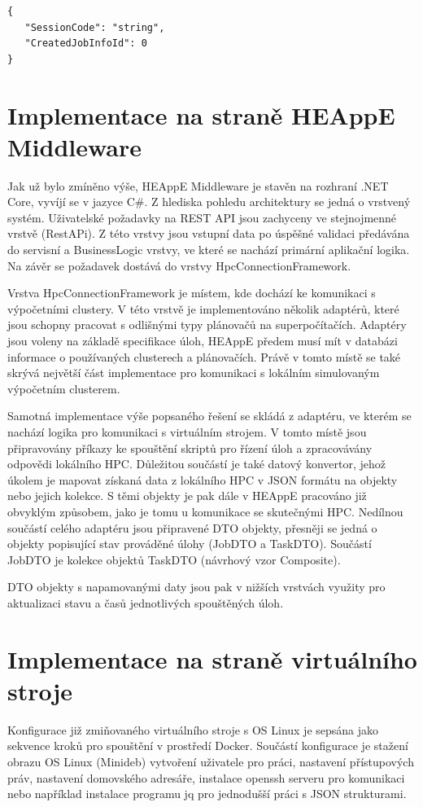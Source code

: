 \hfill \break
\begin{lstlisting}[caption={Příklad json struktury}]
{
   "SessionCode": "string",
   "CreatedJobInfoId": 0
}
\end{lstlisting}

\section{Implementace na straně HEAppE Middleware}
Jak už bylo zmíněno výše, HEAppE Middleware je stavěn na rozhraní .NET Core, vyvíjí se v jazyce C\#. Z hlediska pohledu architektury se jedná o vrstvený systém. Uživatelské požadavky na REST API jsou zachyceny ve stejnojmenné vrstvě (RestAPi). Z této vrstvy jsou vstupní data po úspěšné validaci předávána do servisní a BusinessLogic vrstvy, ve které se nachází primární aplikační logika. Na závěr se požadavek dostává do vrstvy HpcConnectionFramework.

Vrstva HpcConnectionFramework je místem, kde dochází ke komunikaci s výpočetními clustery. V této vrstvě je implementováno několik adaptérů, které jsou schopny pracovat s odlišnými typy plánovačů na superpočítačích. Adaptéry jsou voleny na základě specifikace úloh, HEAppE předem musí mít v databázi informace o používaných clusterech a plánovačích. Právě v tomto místě se také skrývá největší část implementace pro komunikaci s lokálním simulovaným výpočetním clusterem.

Samotná implementace výše popsaného řešení se skládá z adaptéru, ve kterém se nachází logika pro komunikaci s virtuálním strojem. V tomto místě jsou připravovány příkazy ke spouštění skriptů pro řízení úloh a zpracovávány odpovědi lokálního HPC. Důležitou součástí je také datový konvertor, jehož úkolem je mapovat získaná data z lokálního HPC v JSON formátu na objekty nebo jejich kolekce. S těmi objekty je pak dále v HEAppE pracováno již obvyklým způsobem, jako je tomu u komunikace se skutečnými HPC. Nedílnou součástí celého adaptéru jsou připravené DTO objekty, přesněji se jedná o objekty popisující stav prováděné úlohy (JobDTO a TaskDTO). Součástí JobDTO je kolekce objektů TaskDTO (návrhový vzor Composite).

DTO objekty s napamovanými daty jsou pak v nižších vrstvách využity pro aktualizaci stavu a časů jednotlivých spouštěných úloh.

\section{Implementace na straně virtuálního stroje}
Konfigurace již zmiňovaného virtuálního stroje s OS Linux je sepsána jako sekvence kroků pro spouštění v prostředí Docker. Součástí konfigurace je stažení obrazu OS Linux (Minideb) vytvoření uživatele pro práci, nastavení přístupových práv, nastavení domovského adresáře, instalace openssh serveru pro komunikaci nebo například instalace programu jq pro jednodušší práci s JSON strukturami.

